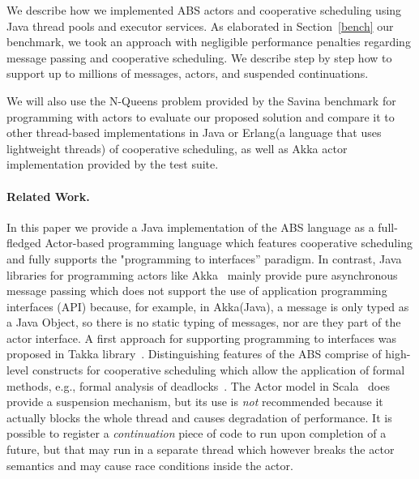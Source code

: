 We describe how we implemented ABS actors and cooperative scheduling using Java thread pools and executor services. 
As elaborated in Section~\ref{bench} our benchmark, we took an approach with negligible performance penalties regarding message passing and cooperative scheduling. 
We describe step by step how to support up to millions of messages, actors, and suspended continuations.


We will also use the N-Queens problem provided by the Savina benchmark for programming with actors\cite{savina} to evaluate our proposed solution and compare it
to other thread-based implementations in Java or Erlang(a language that uses lightweight threads) of cooperative scheduling, as well as Akka actor implementation provided by the test suite. 


\paragraph{Related Work.} 
In this paper we provide a Java implementation of the ABS language as a full-fledged Actor-based programming language which features cooperative scheduling and fully supports the "programming to interfaces'' paradigm. 
In contrast, Java libraries for programming actors like Akka~\cite{Akka} mainly provide pure asynchronous message passing which does not support the use of application programming interfaces (API) because, for example, in Akka(Java), a message is only typed as a Java Object, so there is no static typing of messages, nor are they part of the actor interface. A first approach for supporting programming to interfaces was proposed in Takka library~\cite{takka}. 
Distinguishing features of the ABS comprise of high-level constructs for cooperative scheduling which allow the application of formal methods, e.g.,
formal analysis of deadlocks~\cite{deadlock}.
The Actor model in Scala~\cite{Scala} does provide a suspension mechanism, but its use is \emph{not} recommended because it actually blocks the whole thread and causes
degradation of performance.
It is possible to register a {\em continuation} piece of code to run upon completion of a future, but that may run in a separate thread which however breaks the actor semantics and may cause race conditions inside the actor.

